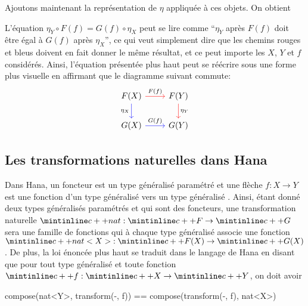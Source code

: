 
Ajoutons maintenant la représentation de $\eta$ appliquée à ces objets. On
obtient


L'équation $\eta_Y \circ F(f) = G(f) \circ \eta_X$ peut se lire comme
``$\eta_Y$ après $F(f)$ doit être égal à $G(f)$ après $\eta_X$'', ce
qui veut simplement dire que les chemins rouges et bleus doivent en fait
donner le même résultat, et ce peut importe les $X$, $Y$ et $f$ considérés.
Ainsi, l'équation présentée plus haut peut se réécrire sous une forme plus
visuelle en affirmant que le diagramme suivant commute:
\[
\begin{tikzcd}
    F(X) \arrow[d, blue, "\eta_X"' black] \arrow[r, red, "F(f)" black] & F(Y) \arrow[d, red, "\eta_Y" black] \\
    G(X) \arrow[r, blue, "G(f)" black] & G(Y)
\end{tikzcd}
\]


\subsection{Les transformations naturelles dans Hana}
Dans Hana, un foncteur est un type généralisé paramétré et une flèche
$f : X \to Y$ est une fonction d'un type généralisé  vers un type
généralisé . Ainsi, étant donné deux types généralisés paramétrés
 et  qui sont des foncteurs, une transformation naturelle
$\icpp{nat} : \icpp{F} \to \icpp{G}$ sera une famille de fonctions qui à
chaque type généralisé  associe une fonction
$\icpp{nat<X>} : \icpp{F(X)} \to \icpp{G(X)}$. De plus, la loi
énoncée plus haut se traduit dans le langage de Hana en disant que pour tout
type généralisé  et toute fonction $\icpp{f} : \icpp{X} \to \icpp{Y}$,
on doit avoir
\begin{cpp}
    compose(nat<Y>, transform(-, f)) == compose(transform(-, f), nat<X>)
\end{cpp}

